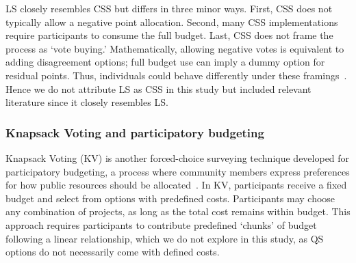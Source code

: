 LS closely resembles CSS but differs in three minor ways. First, CSS does not typically allow a negative point allocation. Second, many CSS implementations require participants to consume the full budget. Last, CSS does not frame the process as `vote buying.' Mathematically, allowing negative votes is equivalent to adding disagreement options; full budget use can imply a dummy option for residual points. Thus, individuals could behave differently under these framings~\cite{shahScarcityFramesValue2015, kahnemanProspectTheoryAnalysis1979}. Hence we do not attribute LS as CSS in this study but included relevant literature since it closely resembles LS.

\subsubsection{Knapsack Voting and participatory budgeting}
Knapsack Voting (KV) is another forced-choice surveying technique developed for participatory budgeting, a process where community members express preferences for how public resources should be allocated~\cite{goelKnapsackVotingParticipatory2019, goel2016budget}. In KV, participants receive a fixed budget and select from options with predefined costs. Participants may choose any combination of projects, as long as the total cost remains within budget. This approach requires participants to contribute predefined `chunks' of budget following a linear relationship, which we do not explore in this study, as QS options do not necessarily come with defined costs.


